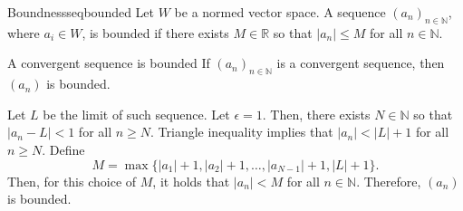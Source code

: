 
\begin{defn}{Boundness}{seqbounded}
	Let \(W\) be a normed vector space.
	A sequence \((a_n)_{n\in\mathbb{N}}\), where \(a_i \in W\), is bounded if there exists \(M \in \mathbb{R}\) so that \(|a_n| \leq M\) for all \(n \in \mathbb{N}\).
\end{defn}

\begin{thm}{A convergent sequence is bounded}{}
	If \((a_n)_{n\in\mathbb{N}}\) is a convergent sequence, then \((a_n)\) is bounded.
\end{thm}

\begin{dem}{}{}
	Let \(L\) be the limit of such sequence.
	Let \(\epsilon = 1\).
	Then, there exists \(N \in \mathbb{N}\) so that \(|a_n - L| < 1\) for all \(n \geq N\).
	Triangle inequality implies that \(|a_n| < |L| + 1\) for all \(n \geq N\).
	Define  \[
		M = \max\{|a_1| + 1, |a_2| + 1, \dots, |a_{N-1}| + 1, |L| + 1\}.
	\]
	Then, for this choice of \(M\), it holds that \(|a_n| < M\) for all \(n \in \mathbb{N}\).
	Therefore, \((a_n)\) is bounded.
\end{dem}

